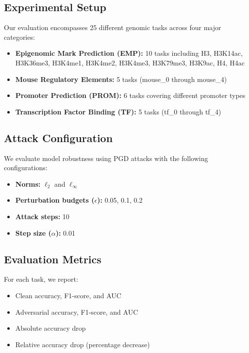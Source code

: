 \documentclass{article} %
\begin{document}
\subsection{Experimental Setup}

Our evaluation encompasses 25 different genomic tasks across four major categories:
\begin{itemize}
    \item \textbf{Epigenomic Mark Prediction (EMP):} 10 tasks including H3, H3K14ac, H3K36me3, H3K4me1, H3K4me2, H3K4me3, H3K79me3, H3K9ac, H4, H4ac
    \item \textbf{Mouse Regulatory Elements:} 5 tasks (mouse\_0 through mouse\_4)
    \item \textbf{Promoter Prediction (PROM):} 6 tasks covering different promoter types
    \item \textbf{Transcription Factor Binding (TF):} 5 tasks (tf\_0 through tf\_4)
\end{itemize}

\subsection{Attack Configuration}

We evaluate model robustness using PGD attacks with the following configurations:
\begin{itemize}
    \item \textbf{Norms:} $\ell_2$ and $\ell_\infty$
    \item \textbf{Perturbation budgets ($\epsilon$):} 0.05, 0.1, 0.2
    \item \textbf{Attack steps:} 10
    \item \textbf{Step size ($\alpha$):} 0.01
\end{itemize}

\subsection{Evaluation Metrics}

For each task, we report:
\begin{itemize}
    \item Clean accuracy, F1-score, and AUC
    \item Adversarial accuracy, F1-score, and AUC
    \item Absolute accuracy drop
    \item Relative accuracy drop (percentage decrease)
\end{itemize}
\end{document}
